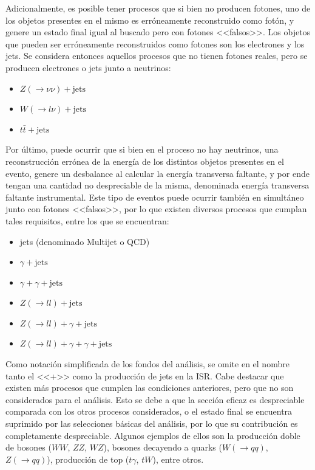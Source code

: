 Adicionalmente, es posible tener procesos que si bien no producen fotones, uno de los objetos presentes en el mismo es erróneamente reconstruido como fotón, y genere un estado final igual al buscado pero con fotones <<falsos>>. Los objetos que pueden ser erróneamente reconstruidos como fotones son los electrones y los jets. Se considera entonces aquellos procesos que no tienen fotones reales, pero se producen electrones o jets junto a neutrinos:

\begin{itemize}
  \item $Z(\rightarrow \nu\nu) + \text{jets}$
  \item $W(\rightarrow l\nu) + \text{jets}$
  \item $t\bar{t} + \text{jets}$
\end{itemize}

Por último, puede ocurrir que si bien en el proceso no hay neutrinos, una reconstrucción errónea de la energía de los distintos objetos presentes en el evento, genere un desbalance al calcular la energía transversa faltante, y por ende tengan una cantidad no despreciable de la misma, denominada energía transversa faltante instrumental. Este tipo de eventos puede ocurrir también en simultáneo junto con fotones <<falsos>>, por lo que existen diversos procesos que cumplan tales requisitos, entre los que se encuentran:

\begin{itemize}
  \item jets (denominado Multijet o QCD)
  \item $\gamma + \text{jets}$
  \item $\gamma + \gamma + \text{jets}$
  \item $Z(\rightarrow ll) + \text{jets}$
  \item $Z(\rightarrow ll) + \gamma + \text{jets}$
  \item $Z(\rightarrow ll) + \gamma + \gamma + \text{jets}$
\end{itemize}

Como notación simplificada de los fondos del análisis, se omite en el nombre tanto el <<+>> como la producción de jets en la ISR. Cabe destacar que existen más procesos que cumplen las condiciones anteriores, pero que no son considerados para el análisis. Esto se debe a que la sección eficaz es despreciable comparada con los otros procesos considerados, o el estado final se encuentra suprimido por las selecciones básicas del análisis, por lo que su contribución es completamente despreciable. Algunos ejemplos de ellos son la producción doble de bosones ($WW$, $ZZ$, $WZ$), bosones decayendo a quarks ($W(\rightarrow qq)$, $Z(\rightarrow qq)$), producción de top ($t\gamma$, $tW$), entre otros.

